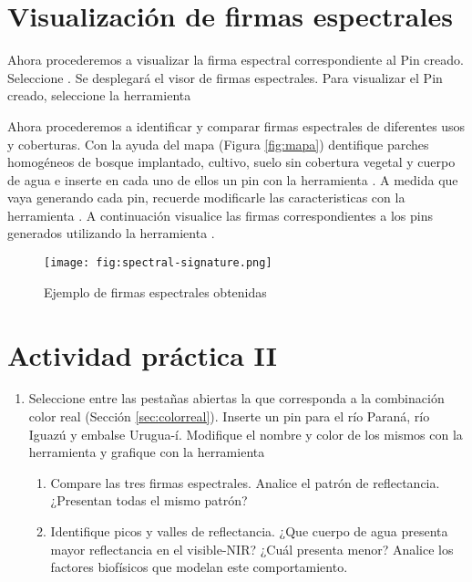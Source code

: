 \begin{enumerate}
\section{Visualización de firmas espectrales}

Ahora procederemos a visualizar la firma espectral correspondiente al Pin creado. Seleccione . Se desplegará el visor de firmas espectrales. Para visualizar el Pin creado, seleccione la herramienta 


Ahora procederemos a identificar y comparar firmas espectrales de diferentes usos y coberturas. Con la ayuda del mapa (Figura \ref{fig:mapa}) dentifique parches homogéneos de bosque implantado, cultivo, suelo sin cobertura vegetal y cuerpo de agua e inserte en cada uno de ellos un pin con la herramienta . A medida que vaya generando cada pin, recuerde modificarle las caracteristicas con la herramienta  . A continuación visualice las firmas correspondientes a los pins generados utilizando la herramienta .

\begin{figure}[h!]
    \centering
    \texttt{[image: fig:spectral-signature.png]}
    \caption{Ejemplo de firmas espectrales obtenidas}
    \label{fig:spectral-signature}
\end{figure}

\section{Actividad práctica II}

\begin{enumerate}
  \item Seleccione entre las pestañas abiertas la que corresponda a la combinación color real (Sección \ref{sec:colorreal}). Inserte un pin para el río Paraná, río Iguazú y embalse Urugua-í. Modifique el nombre y color de los mismos con la herramienta  y grafique con la herramienta 
\begin{enumerate}
    \item Compare las tres firmas espectrales. Analice el patrón de reflectancia. ¿Presentan todas el mismo patrón?
    \item Identifique picos y valles de reflectancia. ¿Que cuerpo de agua presenta mayor reflectancia en el visible-NIR? ¿Cuál presenta menor? Analice los factores biofísicos que modelan este comportamiento.


\end{enumerate}
\end{enumerate}
\end{enumerate}
